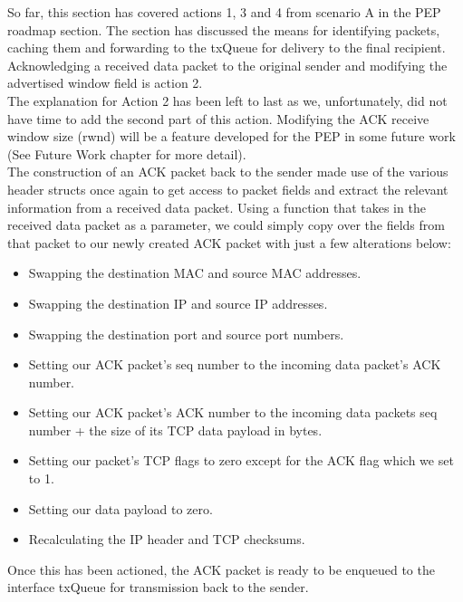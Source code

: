 So far, this section has covered actions 1, 3 and 4 from scenario A in the PEP roadmap section. The section has discussed the means for identifying packets, caching them and forwarding to the txQueue for delivery to the final recipient. Acknowledging a received data packet to the original sender and modifying the advertised window field is action 2. \\

The explanation for Action 2 has been left to last as we, unfortunately, did not have time to add the second part of this action. Modifying the ACK receive window size (rwnd) will be a feature developed for the PEP in some future work (See Future Work chapter for more detail). \\

The construction of an ACK packet back to the sender made use of the various header structs once again to get access to packet fields and extract the relevant information from a received data packet. Using a function that takes in the received data packet as a parameter, we could simply copy over the fields from that packet to our newly created ACK packet with just a few alterations below:\\

\begin{itemize}
\item Swapping the destination MAC and source MAC addresses.
\item Swapping the destination IP  and source IP addresses.
\item Swapping the destination port  and source port numbers.
\item Setting our ACK packet's seq number to the incoming data packet's ACK number.
\item Setting our ACK packet's ACK number to the incoming data packets seq number + the size of its TCP data payload in bytes.
\item Setting our packet's TCP flags to zero except for the ACK flag which we set to 1.
\item Setting our data payload to zero.
\item Recalculating the IP header and TCP checksums. \\
\end{itemize} 

Once this has been actioned, the ACK packet is ready to be enqueued to the interface txQueue for transmission back to the sender. 


